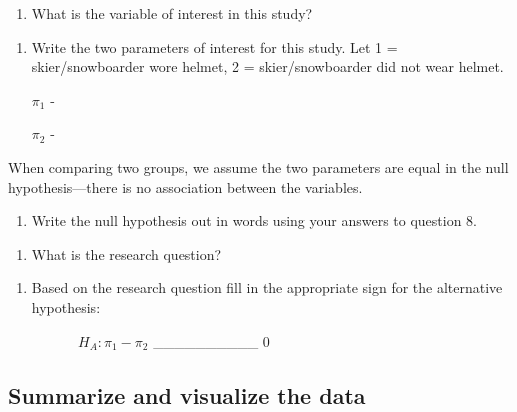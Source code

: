 \documentclass[
]{report}
\providecommand{\tightlist}{%
  \setlength{\itemsep}{0pt}\setlength{\parskip}{0pt}}
\begin{document}
\begin{enumerate}
\def\labelenumi{\arabic{enumi}.}
\setcounter{enumi}{6}
\tightlist
\item
  What is the variable of interest in this study?
\end{enumerate}

\vspace{0.5in}

\begin{enumerate}
\def\labelenumi{\arabic{enumi}.}
\setcounter{enumi}{7}
\item
  Write the two parameters of interest for this study. Let 1 = skier/snowboarder wore helmet, 2 = skier/snowboarder did not wear helmet.

  \(\pi_1\) -
  \vspace{0.5in}

  \(\pi_2\) -
  \vspace{0.5in}
\end{enumerate}

When comparing two groups, we assume the two parameters are equal in the null hypothesis---there is no association between the variables.

\begin{enumerate}
\def\labelenumi{\arabic{enumi}.}
\setcounter{enumi}{8}
\tightlist
\item
  Write the null hypothesis out in words using your answers to question 8.
\end{enumerate}

\vspace{1in}

\begin{enumerate}
\def\labelenumi{\arabic{enumi}.}
\setcounter{enumi}{9}
\tightlist
\item
  What is the research question?
\end{enumerate}

\vspace{1in}

\begin{enumerate}
\def\labelenumi{\arabic{enumi}.}
\setcounter{enumi}{10}
\tightlist
\item
  Based on the research question fill in the appropriate sign for the alternative hypothesis:
  \vspace{0.25in}
\end{enumerate}

~~~~~~~~~~\(H_A: \pi_1 -\pi_2\) \_\_\_\_\_\_\_\_\_\_ 0

\hypertarget{summarize-and-visualize-the-data}{%
\subsection*{Summarize and visualize the data}\label{summarize-and-visualize-the-data}}
\end{document}
